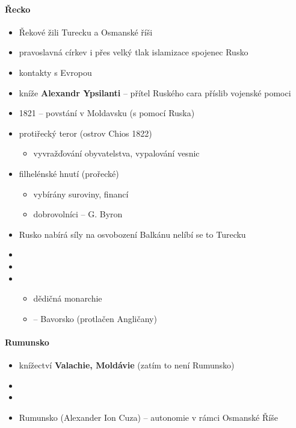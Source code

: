 \paragraph{Řecko}
\begin{itemize}
\item Řekové žili Turecku a Osmanské říši
\item pravoslavná církev i přes velký tlak islamizace \ra spojenec Rusko
\item kontakty s Evropou
\item kníže \textbf{Alexandr Ypsilanti} -- přítel Ruského cara \ra příslib vojenské pomoci
\item 1821 -- povstání v Moldavsku (s pomocí Ruska)
\item protiřecký teror (ostrov Chios 1822)
	\begin{itemize}
	\item vyvražďování obyvatelstva, vypalování vesnic
	\end{itemize}
\item filhelénské hnutí (prořecké) 
	\begin{itemize}
	\item vybírány suroviny, financí
	\item dobrovolníci -- G. Byron
	\end{itemize}
\item Rusko nabírá síly na osvobození Balkánu \ra nelíbí se to Turecku
\item {}
\item {}
\item {}
\begin{itemize}
\item {} \ra dědičná monarchie
\item {} -- Bavorsko (protlačen Angličany)
\end{itemize}
\end{itemize}

\paragraph{Rumunsko}
\begin{itemize}
\item knížectví \textbf{Valachie, Moldávie} (zatím to není Rumunsko)
\item {}
\item {}
\item {} \ra Rumunsko (Alexander Ion Cuza) -- autonomie v rámci Osmanské Říše
\end{itemize}

